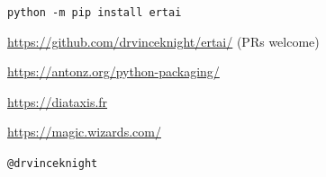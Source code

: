 \documentclass{beamer}
\begin{document}
    \begin{frame}
        \Large
        \begin{center}
            \texttt{python -m pip install ertai}
        \end{center}

        \begin{center}
            \url{https://github.com/drvinceknight/ertai/} (PRs welcome)
        \end{center}

        \begin{center}
            \url{https://antonz.org/python-packaging/}
        \end{center}

        \begin{center}
            \url{https://diataxis.fr}
        \end{center}

        \begin{center}
            \url{https://magic.wizards.com/}
        \end{center}


        \begin{center}
            \texttt{@drvinceknight}
        \end{center}
    \end{frame}
\end{document}
